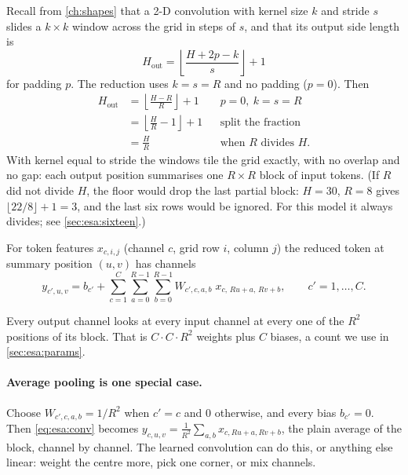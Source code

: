 Recall from \cref{ch:shapes} that a 2-D convolution with kernel size $k$ and stride $s$ slides a
$k\times k$ window across the grid in steps of $s$, and that its output side length is
\begin{equation}\label{eq:esa:outsize}
  H_\text{out} = \left\lfloor \frac{H + 2p - k}{s} \right\rfloor + 1
\end{equation}
for padding $p$. The reduction uses $k = s = R$ and no padding ($p = 0$). Then
\begin{align*}
  H_\text{out} &= \left\lfloor \frac{H - R}{R} \right\rfloor + 1 && p = 0,\ k = s = R\\
  &= \left\lfloor \frac{H}{R} - 1 \right\rfloor + 1 && \text{split the fraction}\\
  &= \frac{H}{R} && \text{when } R \text{ divides } H .
\end{align*}
With kernel equal to stride the windows tile the grid exactly, with no overlap and no gap: each
output position summarises one $R\times R$ block of input tokens. (If $R$ did not divide $H$, the
floor would drop the last partial block: $H = 30$, $R = 8$ gives $\lfloor 22/8\rfloor + 1 = 3$, and
the last six rows would be ignored. For this model it always divides; see
\cref{sec:esa:sixteen}.)

\begin{definition}
For token features $x_{c,i,j}$ (channel $c$, grid row $i$, column $j$) the reduced token at
summary position $(u, v)$ has channels
\begin{equation}\label{eq:esa:conv}
  y_{c',u,v} = b_{c'} + \sum_{c=1}^{C}\sum_{a=0}^{R-1}\sum_{b=0}^{R-1} W_{c',c,a,b}\; x_{c,\,Ru+a,\,Rv+b},
  \qquad c' = 1,\dots,C .
\end{equation}
\end{definition}
Every output channel looks at every input channel at every one of the $R^2$ positions of its
block. That is $C\cdot C\cdot R^2$ weights plus $C$ biases, a count we use in
\cref{sec:esa:params}.

\paragraph{Average pooling is one special case.} Choose $W_{c',c,a,b} = 1/R^2$ when $c' = c$
and 0 otherwise, and every bias $b_{c'} = 0$. Then \cref{eq:esa:conv} becomes
$y_{c,u,v} = \frac{1}{R^2}\sum_{a,b} x_{c,Ru+a,Rv+b}$, the plain average of the block, channel by
channel. The learned convolution can do this, or anything else linear: weight the centre more,
pick one corner, or mix channels.

